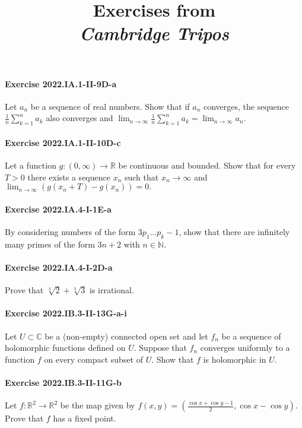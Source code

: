 \documentclass{article}
\title{\textbf{
Exercises from \\
\textit{Cambridge Tripos}
}}
\date{}
\begin{document}
\maketitle

\paragraph{Exercise 2022.IA.1-II-9D-a} Let $a_{n}$ be a sequence of real numbers. Show that if $a_{n}$ converges, the sequence $\frac{1}{n} \sum_{k=1}^{n} a_{k}$ also converges and $\lim _{n \rightarrow \infty} \frac{1}{n} \sum_{k=1}^{n} a_{k}=\lim _{n \rightarrow \infty} a_{n}$.

\paragraph{Exercise 2022.IA.1-II-10D-c} Let a function $g:(0, \infty) \rightarrow \mathbb{R}$ be continuous and bounded. Show that for every $T>0$ there exists a sequence $x_{n}$ such that $x_{n} \rightarrow \infty$ and $\lim _{n \rightarrow \infty}\left(g\left(x_{n}+T\right)-g\left(x_{n}\right)\right)=0 .$

\paragraph{Exercise 2022.IA.4-I-1E-a} By considering numbers of the form $3 p_{1} \ldots p_{k}-1$, show that there are infinitely many primes of the form $3 n+2$ with $n \in \mathbb{N}$.

\paragraph{Exercise 2022.IA.4-I-2D-a} Prove that $\sqrt[3]{2}+\sqrt[3]{3}$ is irrational.

\paragraph{Exercise 2022.IB.3-II-13G-a-i} Let $U \subset \mathbb{C}$ be a (non-empty) connected open set and let $f_n$ be a sequence of holomorphic functions defined on $U$. Suppose that $f_n$ converges uniformly to a function $f$ on every compact subset of $U$. Show that $f$ is holomorphic in $U$.

\paragraph{Exercise 2022.IB.3-II-11G-b} Let $f: \mathbb{R}^{2} \rightarrow \mathbb{R}^{2}$ be the map given by $f(x, y)=\left(\frac{\cos x+\cos y-1}{2}, \cos x-\cos y\right)$. Prove that $f$ has a fixed point.
\end{document}
